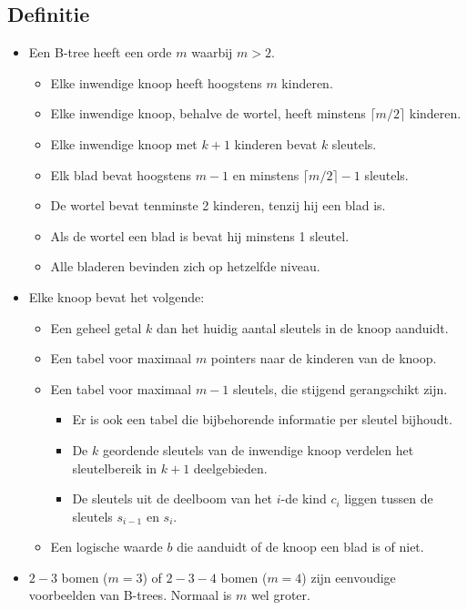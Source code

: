 \subsection{Definitie}
\begin{itemize}
    \item Een B-tree heeft een orde $m$ waarbij $m > 2$.
    \begin{itemize}
        \item Elke inwendige knoop heeft hoogstens $m$ kinderen.
        \item Elke inwendige knoop, behalve de wortel, heeft minstens $\lceil m/2 \rceil$ kinderen.
        \item Elke inwendige knoop met $k + 1$ kinderen bevat $k$ sleutels. 
        \item Elk blad bevat hoogstens $m - 1$ en minstens $\lceil m/2 \rceil - 1$  sleutels.
        \item De wortel bevat tenminste 2 kinderen, tenzij hij een blad is.
        \item Als de wortel een blad is bevat hij minstens 1 sleutel.
        \item Alle bladeren bevinden zich op hetzelfde niveau.
    \end{itemize}
    \item Elke knoop bevat het volgende:
    \begin{itemize}
        \item Een geheel getal $k$ dan het huidig aantal sleutels in de knoop aanduidt.
        \item Een tabel voor maximaal $m$ pointers naar de kinderen van de knoop.
        \item Een tabel voor maximaal $m - 1$ sleutels, die stijgend gerangschikt zijn.
        \begin{itemize}
            \item Er is ook een tabel die bijbehorende informatie per sleutel bijhoudt.
            \item De $k$ geordende sleutels van de inwendige knoop verdelen het sleutelbereik in $k + 1$ deelgebieden.
            \item De sleutels uit de deelboom van het $i$-de kind $c_i$ liggen tussen de sleutels $s_{i - 1}$ en $s_i$.
        \end{itemize} 
        \item Een logische waarde $b$ die aanduidt of de knoop een blad is of niet.
    \end{itemize}
    \item $2-3$ bomen ($m=3$) of $2-3-4$ bomen ($m=4$) zijn eenvoudige voorbeelden van B-trees. Normaal is $m$ wel groter.
\end{itemize}

